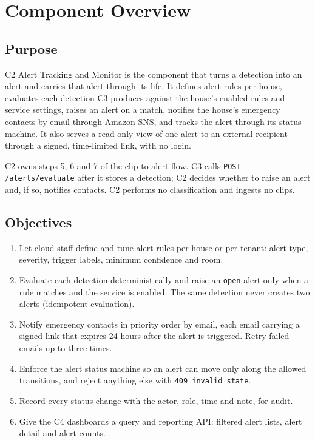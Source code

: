 
\section{Component Overview}

\subsection{Purpose}
C2 Alert Tracking and Monitor is the component that turns a detection into an alert and carries that
alert through its life. It defines alert rules per house, evaluates each detection C3 produces
against the house's enabled rules and service settings, raises an alert on a match, notifies the
house's emergency contacts by email through Amazon SNS, and tracks the alert through its status
machine. It also serves a read-only view of one alert to an external recipient through a signed,
time-limited link, with no login.

C2 owns steps 5, 6 and 7 of the clip-to-alert flow. C3 calls \texttt{POST /alerts/evaluate} after it
stores a detection; C2 decides whether to raise an alert and, if so, notifies contacts. C2 performs
no classification and ingests no clips.

\subsection{Objectives}
\begin{enumerate}
\item Let cloud staff define and tune alert rules per house or per tenant: alert type, severity, trigger labels,
minimum confidence and room.
\item Evaluate each detection deterministically and raise an \texttt{open} alert only when a rule
matches and the service is enabled. The same detection never creates two alerts (idempotent evaluation).
\item Notify emergency contacts in priority order by email, each email carrying a signed link that
expires 24 hours after the alert is triggered. Retry failed emails up to three times.
\item Enforce the alert status machine so an alert can move only along the allowed transitions, and
reject anything else with \texttt{409 invalid\_state}.
\item Record every status change with the actor, role, time and note, for audit.
\item Give the C4 dashboards a query and reporting API: filtered alert lists, alert detail and alert counts.
\end{enumerate}

